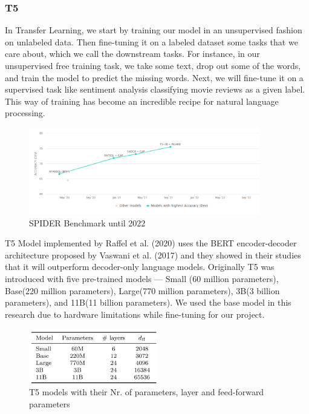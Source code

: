 \subsubsection{T5}

In Transfer Learning, we start by training our model in an unsupervised fashion on unlabeled data. Then fine-tuning it on a labeled dataset some tasks that we care about, which we call the downstream tasks. For instance, in our unsupervised free training task, we take some text, drop out some of the words, and train the model to predict the missing words. Next, we will fine-tune it on a supervised task like sentiment analysis classifying movie reviews as a given label. This way of training has become an incredible recipe for natural language processing.

\begin{figure}[h]
    \centering
    \includegraphics[width=0.9\textwidth]{pics/picard/spider.png}
    \caption{SPIDER Benchmark until 2022}
\end{figure}

T5 Model implemented by Raffel et al. (2020)\cite{raffel_exploring_2020} uses the BERT encoder-decoder architecture proposed by Vaswani et al. (2017) \cite{devlin-etal-2019-bert} and they showed in their studies that it will outperform decoder-only language models. Originally T5 was introduced with five pre-trained models — Small (60 million parameters), Base(220 million parameters), Large(770 million parameters), 3B(3 billion parameters), and 11B(11 billion parameters)\cite{raffel_exploring_2020}. We used the base model in this research due to hardware limitations while fine-tuning for our project.

\begin{figure}[h]
    \centering
    \includegraphics[width=0.5\textwidth]{pics/picard/t5-size.png}
    \caption{T5 models with their Nr. of parameters, layer and feed-forward parameters\cite{raffel_exploring_2020}}
\end{figure}

